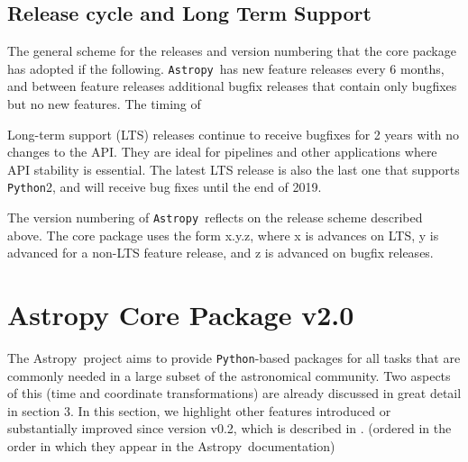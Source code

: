 \documentclass[modern]{aastex61}
\newcommand{\package}[1]{\texttt{#1}}
\newcommand{\python}{\package{Python}}
\newcommand{\astropy}{Astropy}
\newcommand{\astropypkg}{\package{Astropy}}
\begin{document}
\subsection{Release cycle and Long Term Support}
%
\par The general scheme for the releases and version numbering that the core
package has adopted if the following. \astropypkg\ has new feature releases every
6 months, and between feature releases additional bugfix releases that
contain only bugfixes but no new features. The timing of
%
\par Long-term support (LTS) releases continue to receive bugfixes for 2
years with no changes to the API. They are ideal for pipelines and other
applications where API stability is essential. The latest LTS release is
also the last one that supports \python 2, and will receive bug fixes until the
end of 2019.
%
\par The version numbering of \astropypkg\ reflects on the release scheme
described above. The core package uses the form x.y.z, where x is advances
on LTS, y is advanced for a non-LTS feature release, and z is advanced on
bugfix releases.


\section{Astropy Core Package v2.0}
\label{sec:core}
The \astropy\ project aims to provide \python-based packages for all tasks that are commonly needed in a large subset of the astronomical community. Two aspects of this (time and coordinate transformations) are already discussed in great detail in section 3. In this section, we highlight other features introduced or substantially improved since version v0.2, which is described in \citet{astropy}.
(ordered in the order in which they appear in the \astropy\ documentation)
\end{document}

